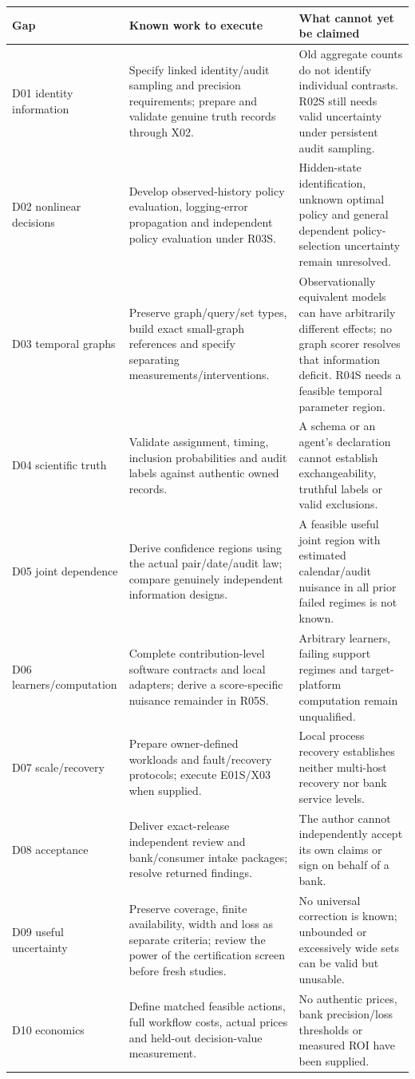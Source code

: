 \documentclass[
  10pt,
]{article}
\begin{document}
\begin{longtable}[]{@{}>{\raggedright\arraybackslash}p{}>{\raggedright\arraybackslash}p{}>{\raggedright\arraybackslash}p{}@{}}
\toprule
Gap & Known work to execute & What cannot yet be claimed\tabularnewline
\midrule
\endhead
D01 identity information & Specify linked identity/audit sampling and
precision requirements; prepare and validate genuine truth records
through X02. & Old aggregate counts do not identify individual
contrasts. R02S still needs valid uncertainty under persistent audit
sampling.\tabularnewline
D02 nonlinear decisions & Develop observed-history policy evaluation,
logging-error propagation and independent policy evaluation under R03S.
& Hidden-state identification, unknown optimal policy and general
dependent policy-selection uncertainty remain unresolved.\tabularnewline
D03 temporal graphs & Preserve graph/query/set types, build exact
small-graph references and specify separating
measurements/interventions. & Observationally equivalent models can have
arbitrarily different effects; no graph scorer resolves that information
deficit. R04S needs a feasible temporal parameter region.\tabularnewline
D04 scientific truth & Validate assignment, timing, inclusion
probabilities and audit labels against authentic owned records. & A
schema or an agent's declaration cannot establish exchangeability,
truthful labels or valid exclusions.\tabularnewline
D05 joint dependence & Derive confidence regions using the actual
pair/date/audit law; compare genuinely independent information designs.
& A feasible useful joint region with estimated calendar/audit nuisance
in all prior failed regimes is not known.\tabularnewline
D06 learners/computation & Complete contribution-level software
contracts and local adapters; derive a score-specific nuisance remainder
in R05S. & Arbitrary learners, failing support regimes and
target-platform computation remain unqualified.\tabularnewline
D07 scale/recovery & Prepare owner-defined workloads and fault/recovery
protocols; execute E01S/X03 when supplied. & Local process recovery
establishes neither multi-host recovery nor bank service
levels.\tabularnewline
D08 acceptance & Deliver exact-release independent review and
bank/consumer intake packages; resolve returned findings. & The author
cannot independently accept its own claims or sign on behalf of a
bank.\tabularnewline
D09 useful uncertainty & Preserve coverage, finite availability, width
and loss as separate criteria; review the power of the certification
screen before fresh studies. & No universal correction is known;
unbounded or excessively wide sets can be valid but
unusable.\tabularnewline
D10 economics & Define matched feasible actions, full workflow costs,
actual prices and held-out decision-value measurement. & No authentic
prices, bank precision/loss thresholds or measured ROI have been
supplied.\tabularnewline
\bottomrule
\end{longtable}
\end{document}

